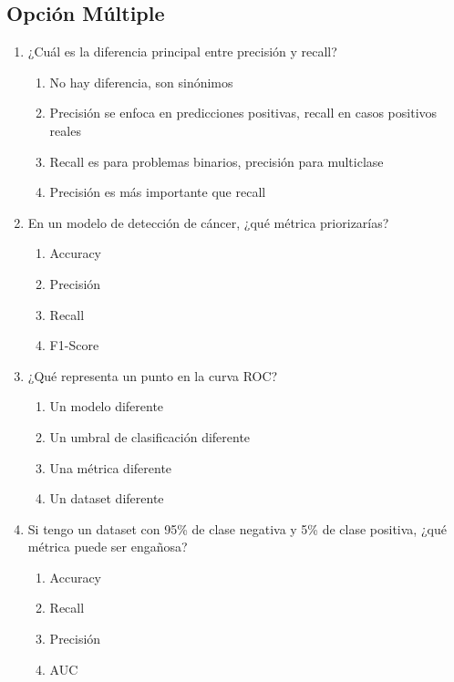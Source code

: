 \documentclass[12pt]{article}
\begin{document}
\subsection{Opción Múltiple}

\begin{enumerate}
    \item ¿Cuál es la diferencia principal entre precisión y recall?
    \begin{enumerate}
        \item No hay diferencia, son sinónimos
        \item Precisión se enfoca en predicciones positivas, recall en casos positivos reales
        \item Recall es para problemas binarios, precisión para multiclase
        \item Precisión es más importante que recall
    \end{enumerate}
    
    \item En un modelo de detección de cáncer, ¿qué métrica priorizarías?
    \begin{enumerate}
        \item Accuracy
        \item Precisión
        \item Recall
        \item F1-Score
    \end{enumerate}
    
    \item ¿Qué representa un punto en la curva ROC?
    \begin{enumerate}
        \item Un modelo diferente
        \item Un umbral de clasificación diferente
        \item Una métrica diferente
        \item Un dataset diferente
    \end{enumerate}
    
    \item Si tengo un dataset con 95\% de clase negativa y 5\% de clase positiva, ¿qué métrica puede ser engañosa?
    \begin{enumerate}
        \item Accuracy
        \item Recall
        \item Precisión
        \item AUC
    \end{enumerate}
    

\end{enumerate}
\end{document}
